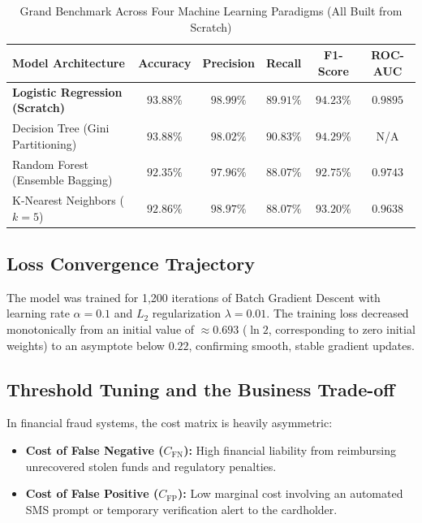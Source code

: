 \documentclass[11pt,a4paper]{article}
\begin{document}
\begin{table}[H]
    \centering
    \caption{Grand Benchmark Across Four Machine Learning Paradigms (All Built from Scratch)}
    \label{tab:multimodel}
    \begin{tabular}{lccccc}
        \toprule
        \textbf{Model Architecture} & \textbf{Accuracy} & \textbf{Precision} & \textbf{Recall} & \textbf{F1-Score} & \textbf{ROC-AUC} \\
        \midrule
        \textbf{Logistic Regression (Scratch)} & $\mathbf{93.88\%}$ & $\mathbf{98.99\%}$ & $89.91\%$ & $94.23\%$ & $\mathbf{0.9895}$ \\
        Decision Tree (Gini Partitioning) & $93.88\%$ & $98.02\%$ & $\mathbf{90.83\%}$ & $\mathbf{94.29\%}$ & N/A \\
        Random Forest (Ensemble Bagging) & $92.35\%$ & $97.96\%$ & $88.07\%$ & $92.75\%$ & $0.9743$ \\
        K-Nearest Neighbors ($k=5$) & $92.86\%$ & $98.97\%$ & $88.07\%$ & $93.20\%$ & $0.9638$ \\
        \bottomrule
    \end{tabular}
\end{table}

\subsection{Loss Convergence Trajectory}
The model was trained for 1,200 iterations of Batch Gradient Descent with learning rate $\alpha = 0.1$ and $L_2$ regularization $\lambda = 0.01$. The training loss decreased monotonically from an initial value of $\approx 0.693$ ($\ln 2$, corresponding to zero initial weights) to an asymptote below $0.22$, confirming smooth, stable gradient updates.

\subsection{Threshold Tuning and the Business Trade-off}
In financial fraud systems, the cost matrix is heavily asymmetric:
\begin{itemize}
    \item \textbf{Cost of False Negative ($C_{\text{FN}}$):} High financial liability from reimbursing unrecovered stolen funds and regulatory penalties.
    \item \textbf{Cost of False Positive ($C_{\text{FP}}$):} Low marginal cost involving an automated SMS prompt or temporary verification alert to the cardholder.
\end{itemize}
\end{document}
